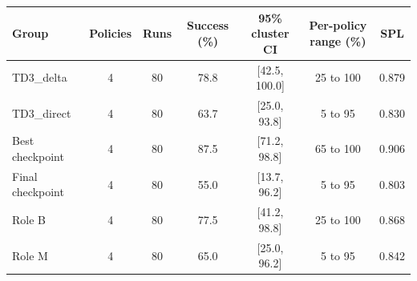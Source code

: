 \begin{tabular}{lcccccc}
\midrule[1.5pt]
\textbf{Group} & \textbf{Policies} & \textbf{Runs} & \textbf{Success (\%)} & \textbf{95\% cluster CI} & \textbf{Per-policy range (\%)} & \textbf{SPL} \\
\midrule[1.5pt]
TD3\_delta & 4 & 80 & 78.8 & [42.5, 100.0] & 25 to 100 & 0.879 \\
TD3\_direct & 4 & 80 & 63.7 & [25.0, 93.8] & 5 to 95 & 0.830 \\
\midrule
Best checkpoint & 4 & 80 & 87.5 & [71.2, 98.8] & 65 to 100 & 0.906 \\
Final checkpoint & 4 & 80 & 55.0 & [13.7, 96.2] & 5 to 95 & 0.803 \\
\midrule
Role B & 4 & 80 & 77.5 & [41.2, 98.8] & 25 to 100 & 0.868 \\
Role M & 4 & 80 & 65.0 & [25.0, 96.2] & 5 to 95 & 0.842 \\
\midrule[1.5pt]
\end{tabular}
